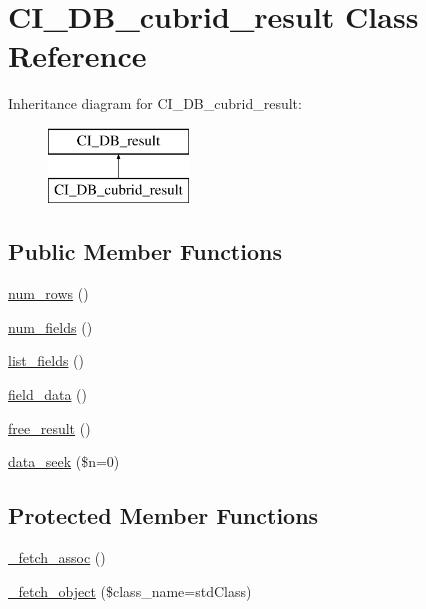 \hypertarget{class_c_i___d_b__cubrid__result}{}\section{C\+I\+\_\+\+D\+B\+\_\+cubrid\+\_\+result Class Reference}
\label{class_c_i___d_b__cubrid__result}
Inheritance diagram for C\+I\+\_\+\+D\+B\+\_\+cubrid\+\_\+result\+:\begin{figure}[H]
\begin{center}
\leavevmode
\includegraphics[height=2.000000cm]{class_c_i___d_b__cubrid__result}
\end{center}
\end{figure}
\subsection*{Public Member Functions}
\begin{DoxyCompactItemize}
\item 
\mbox{\hyperlink{class_c_i___d_b__cubrid__result_a218657c303ee499b97710ab0cd2f5d6e}{num\+\_\+rows}} ()
\item 
\mbox{\hyperlink{class_c_i___d_b__cubrid__result_af831bf363e4d7d661a717a4932af449d}{num\+\_\+fields}} ()
\item 
\mbox{\hyperlink{class_c_i___d_b__cubrid__result_a50b54eb4ea7cfd039740f532988ea776}{list\+\_\+fields}} ()
\item 
\mbox{\hyperlink{class_c_i___d_b__cubrid__result_a84bffd65e53902ade1591716749a33e3}{field\+\_\+data}} ()
\item 
\mbox{\hyperlink{class_c_i___d_b__cubrid__result_aad2d98d6beb3d6095405356c6107b473}{free\+\_\+result}} ()
\item 
\mbox{\hyperlink{class_c_i___d_b__cubrid__result_a8255ae91816e4206e29eb7581c5af0f1}{data\+\_\+seek}} (\$n=0)
\end{DoxyCompactItemize}
\subsection*{Protected Member Functions}
\begin{DoxyCompactItemize}
\item 
\mbox{\hyperlink{class_c_i___d_b__cubrid__result_a43a9a92817f1334a1c10752ec44275a0}{\+\_\+fetch\+\_\+assoc}} ()
\item 
\mbox{\hyperlink{class_c_i___d_b__cubrid__result_a60806be6a9c2488820813c2a7f4fef71}{\+\_\+fetch\+\_\+object}} (\$class\+\_\+name=\textquotesingle{}std\+Class\textquotesingle{})
\end{DoxyCompactItemize}
